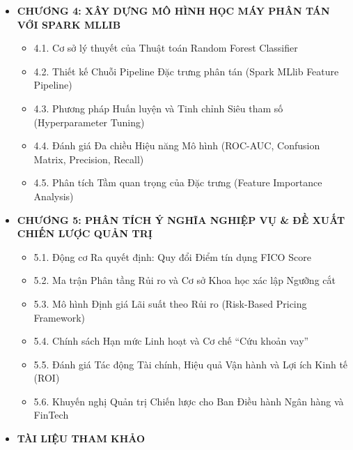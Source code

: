 \documentclass[
  13pt,
  a4paper,
]{report}
\providecommand{\tightlist}{%
  \setlength{\itemsep}{0pt}\setlength{\parskip}{0pt}}
\begin{document}
\begin{itemize}
  \begin{itemize}
  \tightlist
  \item
    3.1. Quy trình Thu thập và Nạp dữ liệu thô (Bronze Layer Ingestion)
  \item
    3.2. Phương pháp Tiền xử lý và Nâng cao chất lượng Dữ liệu phân tán
    (Silver Layer)
  \item
    3.3. Kỹ nghệ đặc trưng tài chính (Financial Feature Engineering)
  \item
    3.4. Phân tích Khám phá Dữ liệu lớn (Exploratory Data Analysis -
    EDA) bằng Spark SQL
  \item
    3.5. Ứng dụng Window Functions trong phân tích vị thế thu nhập và
    rủi ro tín dụng tương đối
  \end{itemize}
\item
  \textbf{CHƯƠNG 4: XÂY DỰNG MÔ HÌNH HỌC MÁY PHÂN TÁN VỚI SPARK MLLIB}

  \begin{itemize}
  \tightlist
  \item
    4.1. Cơ sở lý thuyết của Thuật toán Random Forest Classifier
  \item
    4.2. Thiết kế Chuỗi Pipeline Đặc trưng phân tán (Spark MLlib Feature
    Pipeline)
  \item
    4.3. Phương pháp Huấn luyện và Tinh chỉnh Siêu tham số
    (Hyperparameter Tuning)
  \item
    4.4. Đánh giá Đa chiều Hiệu năng Mô hình (ROC-AUC, Confusion Matrix,
    Precision, Recall)
  \item
    4.5. Phân tích Tầm quan trọng của Đặc trưng (Feature Importance
    Analysis)
  \end{itemize}
\item
  \textbf{CHƯƠNG 5: PHÂN TÍCH Ý NGHĨA NGHIỆP VỤ \& ĐỀ XUẤT CHIẾN LƯỢC
  QUẢN TRỊ}

  \begin{itemize}
  \tightlist
  \item
    5.1. Động cơ Ra quyết định: Quy đổi Điểm tín dụng FICO Score
  \item
    5.2. Ma trận Phân tầng Rủi ro và Cơ sở Khoa học xác lập Ngưỡng cắt
  \item
    5.3. Mô hình Định giá Lãi suất theo Rủi ro (Risk-Based Pricing
    Framework)
  \item
    5.4. Chính sách Hạn mức Linh hoạt và Cơ chế ``Cứu khoản vay''
  \item
    5.5. Đánh giá Tác động Tài chính, Hiệu quả Vận hành và Lợi ích Kinh
    tế (ROI)
  \item
    5.6. Khuyến nghị Quản trị Chiến lược cho Ban Điều hành Ngân hàng và
    FinTech
  \end{itemize}
\item
  \textbf{TÀI LIỆU THAM KHẢO}
\end{itemize}
\end{document}
